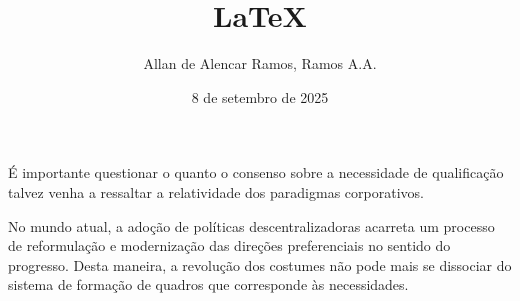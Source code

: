 \documentclass[12pt, a4paper]{article}
\begin{document}
\title{LaTeX}
\author{Allan de Alencar Ramos, Ramos A.A.}
\date{8 de setembro de 2025}
\maketitle
\onehalfspacing

\begin{flushleft}
É importante questionar o quanto o consenso sobre a necessidade de qualificação talvez venha a ressaltar a relatividade dos paradigmas corporativos.\\
\end{flushleft}

No mundo atual, a adoção de políticas descentralizadoras acarreta um processo de reformulação e modernização das direções preferenciais no sentido do progresso.
Desta maneira, a revolução dos costumes não pode mais se dissociar do sistema de formação de quadros que corresponde às necessidades.
\end{document}
